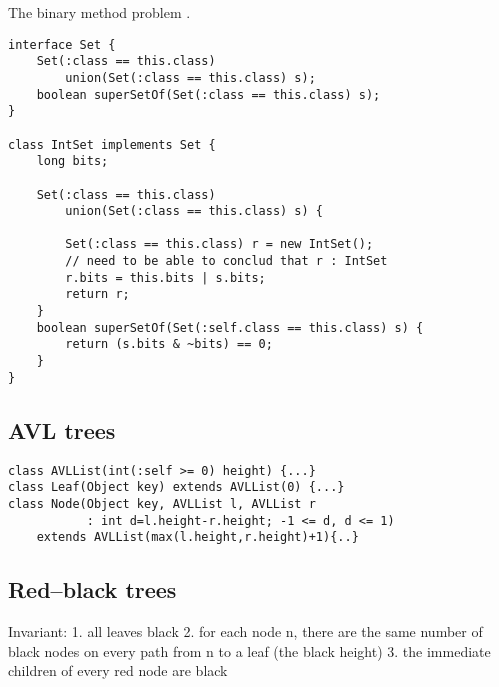 The binary method problem \cite{bruce-binary}.

{\footnotesize
\begin{verbatim}
interface Set {
    Set(:class == this.class)
        union(Set(:class == this.class) s);
    boolean superSetOf(Set(:class == this.class) s);
}

class IntSet implements Set {
    long bits;

    Set(:class == this.class)
        union(Set(:class == this.class) s) {

        Set(:class == this.class) r = new IntSet();
        // need to be able to conclud that r : IntSet
        r.bits = this.bits | s.bits;
        return r;
    }
    boolean superSetOf(Set(:self.class == this.class) s) {
        return (s.bits & ~bits) == 0;
    }
}
\end{verbatim}}

\subsection{AVL trees}

{\footnotesize
\begin{verbatim}
class AVLList(int(:self >= 0) height) {...}
class Leaf(Object key) extends AVLList(0) {...}
class Node(Object key, AVLList l, AVLList r
           : int d=l.height-r.height; -1 <= d, d <= 1) 
    extends AVLList(max(l.height,r.height)+1){..}
\end{verbatim}}


\subsection{Red--black trees}

Invariant:
1. all leaves black
2. for each node n, there are the same number of black nodes on
every path from n to a leaf (the black height)
3. the immediate children of every red node are black

